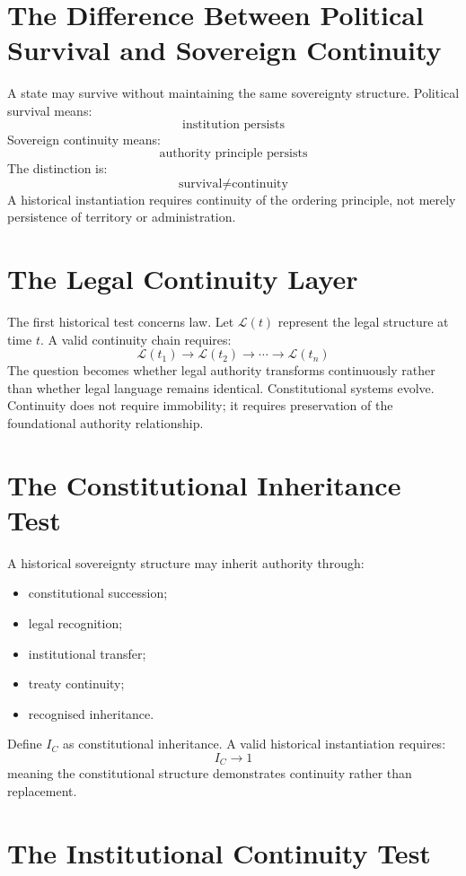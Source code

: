 \documentclass[11pt,openany]{book}
\theoremstyle{plain}
\theoremstyle{definition}
\begin{document}
\section{The Difference Between Political Survival and Sovereign Continuity}

A state may survive without maintaining the same sovereignty structure. Political survival means:
\[
\text{institution persists}
\]
Sovereign continuity means:
\[
\text{authority principle persists}
\]
The distinction is:
\[
\text{survival} \neq \text{continuity}
\]
A historical instantiation requires continuity of the ordering principle, not merely persistence of territory or administration.

\section{The Legal Continuity Layer}

The first historical test concerns law. Let \(\mathcal{L}(t)\) represent the legal structure at time \(t\). A valid continuity chain requires:
\[
\mathcal{L}(t_1) \longrightarrow \mathcal{L}(t_2) \longrightarrow \cdots \longrightarrow \mathcal{L}(t_n)
\]
The question becomes whether legal authority transforms continuously rather than whether legal language remains identical. Constitutional systems evolve. Continuity does not require immobility; it requires preservation of the foundational authority relationship.

\section{The Constitutional Inheritance Test}

A historical sovereignty structure may inherit authority through:
\begin{itemize}
\item constitutional succession;
\item legal recognition;
\item institutional transfer;
\item treaty continuity;
\item recognised inheritance.
\end{itemize}
Define \(I_C\) as constitutional inheritance. A valid historical instantiation requires:
\[
I_C \to 1
\]
meaning the constitutional structure demonstrates continuity rather than replacement.

\section{The Institutional Continuity Test}
\end{document}
